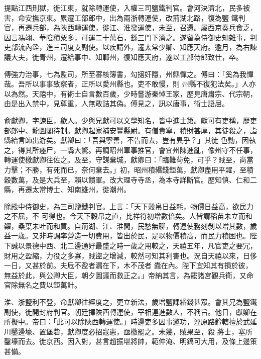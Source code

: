 \begin{pinyinscope}
 提點江西刑獄，徙江東，就除轉運使，入權三司鹽鐵判官。會河決濟北，民多被害，命安撫京東。累遷工部郎中，出為兩浙轉運使，改荊湖北路，復為鹽
 鐵判官，再遷兵部，為陜西轉運使，徙江、淮發運使，未至，召還。屬西京奏兵食乏，因言馮翊、華陰積粟多，可運二十萬石，繇三門下濟之。遂留為侍御史知雜事，判吏部流內銓，進三司度支副使。以疾請外，遷太常少卿、知應天府。逾月，為右諫議大夫，徙青州，遷給事中、知鄆州，復知應天府，遂以工部侍郎致仕，卒。



 傅強力治事，七為監司，所至審核簿書，勾擿奸隱，州縣憚之。傅曰：「奚為我憚哉。吾所以事事致察者，正所以愛州縣也。吏不敢慢，則
 州縣不復犯法矣。」人亦以為然。天禧中，有術士自言數百歲，少時嘗游秦悼王家，歷見唐肅宗、代宗朝，由是出入禁中，見尊重，人無敢詰其偽。傅見之，訊以唐事，術士語屈。



 俞獻卿，字諫臣，歙人。少與兄獻可以文學知名，皆中進士第。獻可有吏稱，歷吏部郎中、龍圖閣待制。獻卿起家補安豐縣尉。有僧貴寧，積財甚厚，其徒殺之，詣縣紿言師出游矣。獻卿曰：「吾與寧善，不告而去，豈有異乎？」其徒
 色動，因執之，得其所瘞尸，一縣大驚。再調昭州軍事推官，會宜州陳進亂，像州守不任事，轉運使檄獻卿往佐之。及至，守謀棄城，獻卿曰：「臨難茍免，可乎？賊至，尚當力擊；不勝，有死而已，奈何棄去。」初，昭州積緡錢鉅萬，獻卿盡用平糴，至積穀數萬，及是大兵至，賴以饋軍。改大理寺寺丞，為本寺詳斷官。歷知慎、仁和二縣，再遷太常博士、知南雄州，徙潮州。



 除殿中侍御史，為三司鹽鐵判官。上言：「天下穀帛日益耗，物價日益高，欲民力之不屈，不
 可得也。今天下穀帛之直，比祥符初增數倍矣。人皆謂稻苗未立而和糴，桑葉未吐而和買。自荊湖、江、淮間，民愁無聊，轉運使務刻剝以增其數，歲益一歲。又非時調率營造一切費用，皆出於民，是以物價積高，而民力積困也。陛下誠以景德中西、北二邊通好最盛之時一歲之用較之，天禧五年，凡官吏之要冗，財用之盈縮，力役之多寡，賊盜之增減，較然可知其利害也。況自天禧以來，日侈一日，又甚於前。夫卮不盈者漏在下，木不茂者
 蠹在內。陛下宜知其有損於彼，無益於此，與公卿大臣，朝夕圖議而救正之。」帝納其言，為罷諸宮觀兵衛，又命官除無名之費以鉅萬計。



 淮、浙鹽利不登，命獻卿往經度之，更立新法，歲增鹽課緡錢甚眾。會其兄為鹽鐵副使，徙開封府判官。朝廷擇陜西轉運使，宰相連進數人，不稱旨。他日，獻卿在所擬中。帝曰：「此可以除陜西轉運使。」時邊吏多因事邀功，涇原路鈐轄擅於武延川鑿邊壕、置堡砦，獻卿度必招寇患，亟檄罷之。未幾，賊果至，殺
 將士，塞所鑿壕而去。徙京西。因入對，甚言趙振堪將帥，範仲淹、明鎬可大用，及條上邊策甚備。




\end{pinyinscope}
